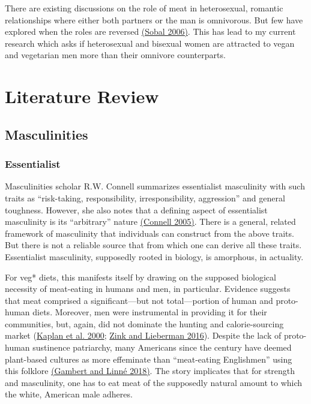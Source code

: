 \documentclass[twoside]{report}
\let\oldsection\section
\renewcommand\section{\clearpage\oldsection}
\begin{document}
There are existing discussions on the role of meat in heterosexual, romantic relationships where either both partners or the man is omnivorous. But few have explored when the roles are reversed \hyperlink{sobal}{(Sobal 2006)}. This has lead to my current research which asks if heterosexual and bisexual women are attracted to vegan and vegetarian men more than their omnivore counterparts.

\restoregeometry
\pagebreak

\pagestyle{fancy}
\fancyhf{}
\fancyfoot[LE,RO]{\thepage}

\twocolumn

\section{Literature Review}

\subsection{Masculinities}

\subsubsection{Essentialist}

Masculinities scholar R.W. Connell summarizes essentialist masculinity with such traits as ``risk-taking, responsibility, irresponsibility, aggression'' and general toughness. However, she also notes that a defining aspect of essentialist masculinity is its ``arbitrary'' nature \hyperlink{connell}{(Connell 2005)}. There is a general, related framework of masculinity that individuals can construct from the above traits. But there is not a reliable source that from which one can derive all these traits. Essentialist masculinity, supposedly rooted in biology, is amorphous, in actuality.

For veg* diets, this manifests itself by drawing on the supposed biological necessity of meat-eating in humans and men, in particular. Evidence suggests that meat comprised a significant---but not total---portion of human and proto-human diets. Moreover, men were instrumental in providing it for their communities, but, again, did not dominate the hunting and calorie-sourcing market (\hyperlink{kaplan}{Kaplan et al. 2000}; \hyperlink{zink}{Zink and Lieberman 2016}). Despite the lack of proto-human sustinence patriarchy, many Americans since the  century have deemed plant-based cultures as more effeminate than ``meat-eating Englishmen'' using this folklore \hyperlink{gambert}{(Gambert and Linné 2018)}. The story implicates that for strength and masculinity, one has to eat meat of the supposedly natural amount to which the white, American male adheres.
\end{document}
